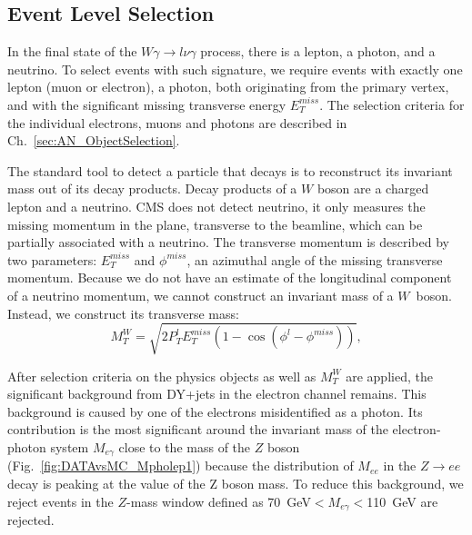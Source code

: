 \subsection{Event Level Selection}
\label{sec:AN_Selection_EventLevel}

In the final state of the $W\gamma\rightarrow l\nu\gamma$ process, there is a lepton, a photon, and a neutrino. To select events with such signature, we require events with exactly one lepton (muon or electron), a photon, both originating from the primary vertex, and with the significant missing transverse energy $E_T^{miss}$. The selection criteria for the individual electrons, muons and photons are described in Ch.~\ref{sec:AN_ObjectSelection}.

The standard tool to detect a particle that decays is to reconstruct its invariant mass out of its decay products. Decay products of a $W$ boson are a charged lepton and a neutrino. CMS does not detect neutrino, it only measures the missing momentum in the plane, transverse to the beamline, which can be partially associated with a neutrino. The transverse momentum is described by two parameters: $E_T^{miss}$ and $\phi^{miss}$, an azimuthal angle of the missing transverse momentum. Because we do not have an estimate of the longitudinal component of a neutrino momentum, we cannot construct an invariant mass of a $W$~boson. Instead, we construct its transverse mass:
\begin{equation}
M_T^W=\sqrt{2  P_T^{l}  E_T^{miss}  (1-\cos{(\phi^{l}-\phi^{miss})})},
\end{equation}

After selection criteria on the physics objects as well as $M_T^W$ are applied, the significant background from DY+jets in the electron channel remains. This background is caused by one of the electrons misidentified as a photon. Its contribution is the most significant around the invariant mass of the electron-photon system $M_{e\gamma}$ close to the mass of the $Z$ boson (Fig.~\ref{fig:DATAvsMC_Mpholep1}) because the distribution of $M_{ee}$ in the $Z\rightarrow e e$ decay is peaking at the value of the Z boson mass. To reduce this background, we reject events in the $Z$-mass window defined as 70~GeV$<M_{e\gamma}<$110~GeV are rejected. 


